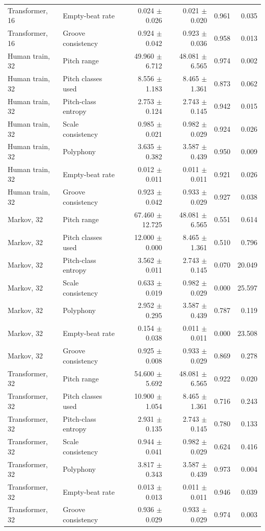 \begin{tabular}{llrrrr}
Transformer, 16 & Empty-beat rate & 0.024 $\pm$ 0.026 & 0.021 $\pm$ 0.020 & 0.961 & 0.035 \\
Transformer, 16 & Groove consistency & 0.924 $\pm$ 0.042 & 0.923 $\pm$ 0.036 & 0.958 & 0.013 \\
Human train, 32 & Pitch range & 49.960 $\pm$ 6.712 & 48.081 $\pm$ 6.565 & 0.974 & 0.002 \\
Human train, 32 & Pitch classes used & 8.556 $\pm$ 1.183 & 8.465 $\pm$ 1.361 & 0.873 & 0.062 \\
Human train, 32 & Pitch-class entropy & 2.753 $\pm$ 0.124 & 2.743 $\pm$ 0.145 & 0.942 & 0.015 \\
Human train, 32 & Scale consistency & 0.985 $\pm$ 0.021 & 0.982 $\pm$ 0.029 & 0.924 & 0.026 \\
Human train, 32 & Polyphony & 3.635 $\pm$ 0.382 & 3.587 $\pm$ 0.439 & 0.950 & 0.009 \\
Human train, 32 & Empty-beat rate & 0.012 $\pm$ 0.011 & 0.011 $\pm$ 0.011 & 0.921 & 0.026 \\
Human train, 32 & Groove consistency & 0.923 $\pm$ 0.042 & 0.933 $\pm$ 0.029 & 0.927 & 0.038 \\
Markov, 32 & Pitch range & 67.460 $\pm$ 12.725 & 48.081 $\pm$ 6.565 & 0.551 & 0.614 \\
Markov, 32 & Pitch classes used & 12.000 $\pm$ 0.000 & 8.465 $\pm$ 1.361 & 0.510 & 0.796 \\
Markov, 32 & Pitch-class entropy & 3.562 $\pm$ 0.011 & 2.743 $\pm$ 0.145 & 0.070 & 20.049 \\
Markov, 32 & Scale consistency & 0.633 $\pm$ 0.019 & 0.982 $\pm$ 0.029 & 0.000 & 25.597 \\
Markov, 32 & Polyphony & 2.952 $\pm$ 0.295 & 3.587 $\pm$ 0.439 & 0.787 & 0.119 \\
Markov, 32 & Empty-beat rate & 0.154 $\pm$ 0.038 & 0.011 $\pm$ 0.011 & 0.000 & 23.508 \\
Markov, 32 & Groove consistency & 0.925 $\pm$ 0.008 & 0.933 $\pm$ 0.029 & 0.869 & 0.278 \\
Transformer, 32 & Pitch range & 54.600 $\pm$ 5.692 & 48.081 $\pm$ 6.565 & 0.922 & 0.020 \\
Transformer, 32 & Pitch classes used & 10.900 $\pm$ 1.054 & 8.465 $\pm$ 1.361 & 0.716 & 0.243 \\
Transformer, 32 & Pitch-class entropy & 2.931 $\pm$ 0.135 & 2.743 $\pm$ 0.145 & 0.780 & 0.133 \\
Transformer, 32 & Scale consistency & 0.944 $\pm$ 0.041 & 0.982 $\pm$ 0.029 & 0.624 & 0.416 \\
Transformer, 32 & Polyphony & 3.817 $\pm$ 0.343 & 3.587 $\pm$ 0.439 & 0.973 & 0.004 \\
Transformer, 32 & Empty-beat rate & 0.013 $\pm$ 0.013 & 0.011 $\pm$ 0.011 & 0.946 & 0.039 \\
Transformer, 32 & Groove consistency & 0.936 $\pm$ 0.029 & 0.933 $\pm$ 0.029 & 0.974 & 0.003 \\
\bottomrule
\end{tabular}

